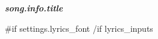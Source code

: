 \documentclass{article}
\begin{document}
\begin{center}
{
    \Fontskrivan\bfseries\slshape
    \fontsize{40pt}{35pt}\selectfont
    \color{blue}
    {{{song.info.title}}}
} \\[0.5em]
{
}
\end{center}
\vspace{1em}

{{#if settings.lyrics_font}}
{{/if}}
\centering
{{{lyrics_inputs}}}
\end{document}
